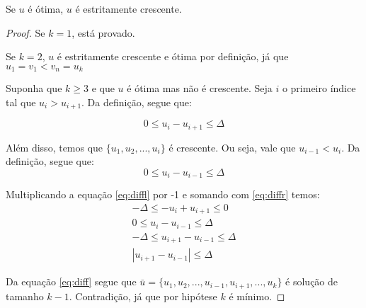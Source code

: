 \begin{prop} \label{salto:cres}
Se $u$ é ótima, $u$ é estritamente crescente.
\end{prop}
\begin{proof}

Se $k = 1$, está provado.

Se $k = 2$, $u$ é estritamente crescente e ótima por definição, já que $u_1 = v_1 < v_n = u_{k}$

Suponha que $k \geq 3$ e que $u$ é ótima mas não é crescente. Seja $i$ o primeiro índice tal que $u_{i} > u_{i + 1}$. Da definição, segue que:

\begin{equation} \label{eq:diffr}
0 \leq u_i - u_{i + 1} \leq \Delta
\end{equation}

Além disso, temos que $\{u_1, u_2, ..., u_i\}$ é crescente. Ou seja, vale que $u_{i - 1} < u_i$. Da definição, segue que:
\begin{equation} \label{eq:diffl}
0 \leq u_i - u_{i - 1} \leq \Delta
\end{equation}

Multiplicando a equação \ref{eq:diffl} por -1 e somando com \ref{eq:diffr} temos:
\begin{align}  \label{eq:diff}
-\Delta \leq - u_i + u_{i + 1} \leq 0 \nonumber \\
0 \leq u_i - u_{i - 1} \leq \Delta \nonumber \\
-\Delta \leq u_{i + 1} - u_{i - 1} \leq \Delta \nonumber \\
|u_{i + 1} - u_{i - 1}| \leq \Delta
\end{align}

Da equação \ref{eq:diff} segue que $\bar{u} = \{u_1, u_2, ..., u_{i - 1}, u_{i + 1}, ..., u_k\}$ é solução de tamanho $k - 1$. Contradição, já que por hipótese $k$ é mínimo.

\end{proof}

